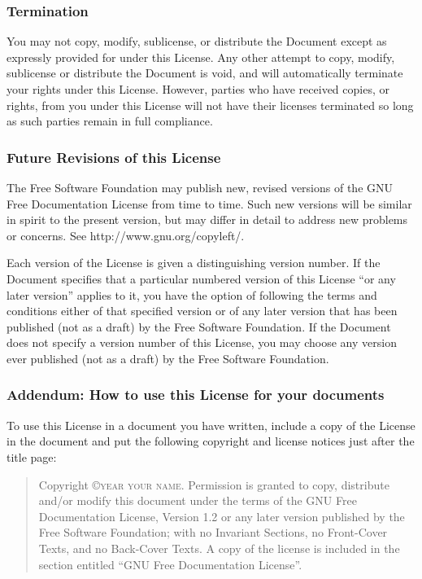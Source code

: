 \documentclass{article}
\begin{document}
\subsubsection{Termination}

You may not copy, modify, sublicense, or distribute the Document except
as expressly provided for under this License.  Any other attempt to
copy, modify, sublicense or distribute the Document is void, and will
automatically terminate your rights under this License.  However,
parties who have received copies, or rights, from you under this
License will not have their licenses terminated so long as such
parties remain in full compliance.


\subsubsection{Future Revisions of this License}

The Free Software Foundation may publish new, revised versions
of the GNU Free Documentation License from time to time.  Such new
versions will be similar in spirit to the present version, but may
differ in detail to address new problems or concerns.  See
http://www.gnu.org/copyleft/.

Each version of the License is given a distinguishing version number.
If the Document specifies that a particular numbered version of this
License ``or any later version'' applies to it, you have the option of
following the terms and conditions either of that specified version or
of any later version that has been published (not as a draft) by the
Free Software Foundation.  If the Document does not specify a version
number of this License, you may choose any version ever published (not
as a draft) by the Free Software Foundation.


\subsubsection{Addendum: How to use this License for your documents}

To use this License in a document you have written, include a copy of
the License in the document and put the following copyright and
license notices just after the title page:

\bigskip
\begin{quote}
    Copyright \copyright \textsc{year your name}.
    Permission is granted to copy, distribute and/or modify this document
    under the terms of the GNU Free Documentation License, Version 1.2
    or any later version published by the Free Software Foundation;
    with no Invariant Sections, no Front-Cover Texts, and no Back-Cover Texts.
    A copy of the license is included in the section entitled ``GNU
    Free Documentation License''.
\end{quote}
\bigskip
\end{document}
